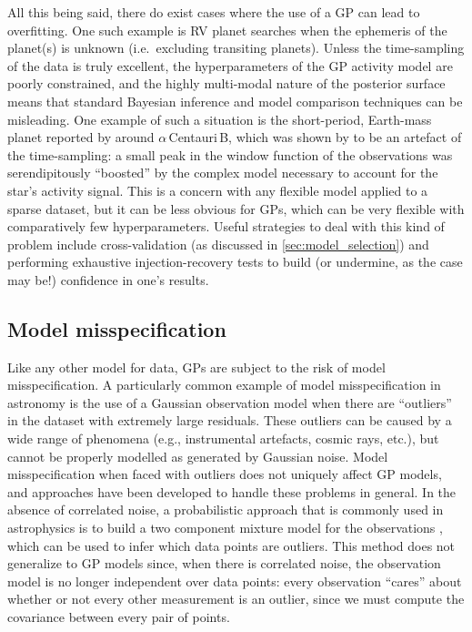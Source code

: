 \documentclass[letterpaper]{ar-1col}
\begin{document}
All this being said, there do exist cases where the use of a GP can lead to overfitting. One such example is RV planet searches when the ephemeris of the planet(s) is unknown (i.e.\ excluding transiting planets). Unless the time-sampling of the data is truly excellent, the hyperparameters of the GP activity model are poorly constrained, and the highly multi-modal nature of the posterior surface means that standard Bayesian inference and model comparison techniques can be misleading. One example of such a situation is the short-period, Earth-mass planet reported by \citet{2012Natur.491..207D} around $\alpha$\,Centauri\,B, which was shown by \citet{2016MNRAS.456L...6R} to be an artefact of the time-sampling: a small peak in the window function of the observations was serendipitously ``boosted'' by the complex model necessary to account for the star's activity signal. This is a concern with any flexible model applied to a sparse dataset, but it can be less obvious for GPs, which can be very flexible with comparatively few hyperparameters. Useful strategies to deal with this kind of problem include cross-validation (as discussed in \autoref{sec:model_selection}) and performing exhaustive injection-recovery tests to build (or undermine, as the case may be!) confidence in one's results. 

\subsection{Model misspecification}

Like any other model for data, GPs are subject to the risk of model misspecification.
A particularly common example of model misspecification in astronomy is the use of a Gaussian observation model when there are ``outliers'' in the dataset with extremely large residuals.
These outliers can be caused by a wide range of phenomena (e.g., instrumental artefacts, cosmic rays, etc.), but cannot be properly modelled as generated by Gaussian noise.
Model misspecification when faced with outliers does not uniquely affect GP models, and approaches have been developed to handle these problems in general.
In the absence of correlated noise, a probabilistic approach that is commonly used in astrophysics is to build a two component mixture model for the observations \citep[e.g.,][]{1997upa..conf...49P, 2010arXiv1008.4686H}, which can be used to infer which data points are outliers.
This method does not generalize to GP models since, when there is correlated noise, the observation model is no longer independent over data points:
every observation ``cares'' about whether or not every other measurement is an outlier, since we must compute the covariance between every pair of points.
\end{document}
